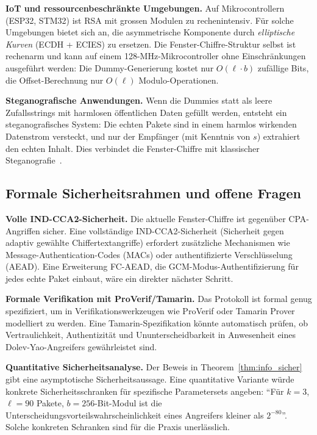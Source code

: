 ﻿\documentclass[12pt, a4paper]{article}
\theoremstyle{plain}
\theoremstyle{definition}
\theoremstyle{remark}
\begin{document}
\textbf{IoT und ressourcenbeschr\"ankte Umgebungen.}
Auf Mikrocontrollern (ESP32, STM32) ist RSA mit grossen Modulen zu
rechenintensiv. F\"ur solche Umgebungen bietet sich an, die asymmetrische
Komponente durch \emph{elliptische Kurven} (ECDH + ECIES) zu ersetzen.
Die Fenster-Chiffre-Struktur selbst ist rechenarm und kann auf einem
128-MHz-Mikrocontroller ohne Einschr\"ankungen ausgef\"uhrt werden:
Die Dummy-Generierung kostet nur $O(\ell \cdot b)$ zuf\"allige Bits,
die Offset-Berechnung nur $O(\ell)$ Modulo-Operationen.

\textbf{Steganografische Anwendungen.}
Wenn die Dummies statt als leere Zufallsstrings mit harmlosen \"offentlichen
Daten gef\"ullt werden, entsteht ein steganografisches System:
Die echten Pakete sind in einem harmlos wirkenden Datenstrom versteckt,
und nur der Empf\"anger (mit Kenntnis von $s$) extrahiert den echten Inhalt.
Dies verbindet die Fenster-Chiffre mit klassischer Steganografie~\cite{anderson1998limits}.

\subsection{Formale Sicherheitsrahmen und offene Fragen}

\textbf{Volle IND-CCA2-Sicherheit.}
Die aktuelle Fenster-Chiffre ist gegen\"uber CPA-Angriffen sicher.
Eine vollst\"andige IND-CCA2-Sicherheit (Sicherheit gegen adaptiv
gew\"ahlte Chiffertextangriffe) erfordert zus\"atzliche Mechanismen
wie Message-Authentication-Codes (MACs) oder authentifizierte Verschl\"usselung
(AEAD). Eine Erweiterung FC-AEAD, die GCM-Modus-Authentifizierung
f\"ur jedes echte Paket einbaut, w\"are ein direkter n\"achster Schritt.

\textbf{Formale Verifikation mit ProVerif/Tamarin.}
Das Protokoll ist formal genug spezifiziert, um in Verifikationswerkzeugen
wie ProVerif oder Tamarin Prover \cite{basin2018tamarin} modelliert zu werden.
Eine Tamarin-Spezifikation k\"onnte automatisch pr\"ufen, ob Vertraulichkeit,
Authentizit\"at und Ununterscheidbarkeit in Anwesenheit eines Dolev-Yao-Angreifers
gew\"ahrleistet sind.

\textbf{Quantitative Sicherheitsanalyse.}
Der Beweis in Theorem~\ref{thm:info_sicher} gibt eine asymptotische
Sicherheitsaussage. Eine quantitative Variante w\"urde konkrete
Sicherheitsschranken f\"ur spezifische Parametersets angeben:
``F\"ur $k=3$, $\ell=90$ Pakete, $b=256$-Bit-Modul ist die
Unterscheidungsvorteilswahrscheinlichkeit eines Angreifers kleiner als $2^{-80}$''.
Solche konkreten Schranken sind f\"ur die Praxis unerl\"asslich.
\end{document}
